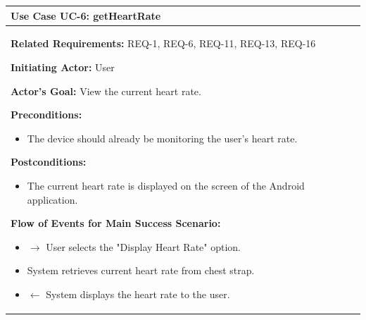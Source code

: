 \documentclass[letterpaper,english, 12pt]{scrreprt}
\begin{document}
\begin{center}
        \begin{tabular}{|C{15cm}|}
                \hline
                        \textbf{Use Case UC-6: getHeartRate}\\
                \hline
                        \begin{flushleft}
                                \textbf{Related Requirements: } REQ-1, REQ-6, REQ-11, REQ-13, REQ-16
                        \end{flushleft}
                        \begin{flushleft}
                                \textbf{Initiating Actor: } User
                        \end{flushleft}
                        \begin{flushleft}
                                \textbf{Actor's Goal: } View the current heart rate.
                        \end{flushleft}
                        \begin{flushleft}
                                \textbf{Preconditions: }
                        \end{flushleft}
                                \begin{itemize}
                                        \item The device should already be monitoring the user's heart rate.
                                \end{itemize}
                        \begin{flushleft}
                                \textbf{Postconditions: }
                        \end{flushleft}
                                \begin{itemize}
                                        \item The current heart rate is displayed on the screen of the Android application.
                                \end{itemize}
                        \begin{flushleft}
                                \textbf{Flow of Events for Main Success Scenario: }
                        \end{flushleft}
                                \begin{itemize}
                                        \item $\rightarrow$ User selects the "Display Heart Rate" option.
                                        \item System retrieves current heart rate from chest strap.
                                        \item $\leftarrow$ System displays the heart rate to the user.
                                \end{itemize}
                \hline
        \end{tabular}
\end{center}
\end{document}
